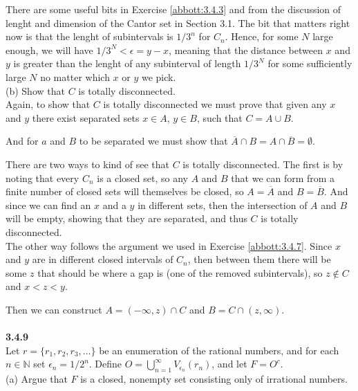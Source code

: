 There are some useful bits in Exercise \ref{abbott:3.4.3} and from the discussion of lenght and dimension
of the Cantor set in Section 3.1.
The bit that matters right now is that the lenght of subintervals is $1/3^n$ for $C_n$.
Hence, for some $N$ large enough, we will have $1/3^N < \epsilon = y - x$, meaning that the distance
between $x$ and $y$ is greater than the lenght of any subinterval of length $1/3^N$ for some
sufficiently large $N$ no matter which $x$ or $y$ we pick.
\\

(b) Show that $C$ is totally disconnected.
\\

Again, to show that $C$ is totally disconnected we must prove that given any $x$ and $y$
there exist separated sets $x \in A$, $y \in B$, such that $C = A \cup B$.

And for $a$ and $B$ to be separated we must show that
$\overline{A} \cap B = A \cap \overline{B} = \emptyset$.

There are two ways to kind of see that $C$ is totally disconnected.
The first is by noting that every $C_n$ is a closed set, so any $A$ and $B$ that we can form from
a finite number of closed sets will themselves be closed, so $A = \overline{A}$ and $B = \overline{B}$.
And since we can find an $x$ and a $y$ in different sets, then the intersection of $A$ and $B$ will
be empty, showing that they are separated, and thus $C$ is totally disconnected.
\\

The other way follows the argument we used in Exercise \ref{abbott:3.4.7}.
Since $x$ and $y$ are in different closed intervals of $C_n$, then between them there will be some
$z$ that should be where a gap is (one of the removed subintervals), so $z \not\in C$ and
$x < z < y$.

Then we can construct $A = (-\infty, z) \cap C$ and $B = C \cap (z,\infty)$.
\\~\\




\textbf{3.4.9}
\\

Let $r = \{ r_1, r_2, r_3, \ldots \}$ be an enumeration of the rational numbers,
and for each $n \in \mathbb{N}$ set $\epsilon_n = 1/2^n$.
Define $O = \bigcup^{\infty}_{n=1} V_{\epsilon_n} ( r_n )$,
and let $F = O^c$.
\\

(a) Argue that $F$ is a closed, nonempty set consisting only of irrational numbers.
\\

